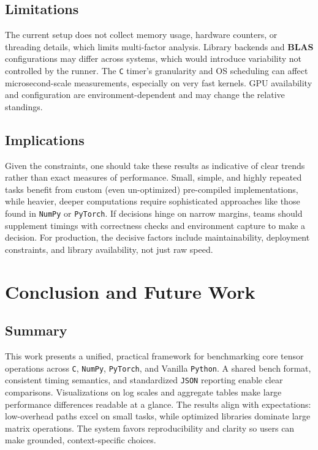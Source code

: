 \documentclass[a4paper,12pt]{article}
\begin{document}
\subsection{Limitations}
The current setup does not collect memory usage, hardware counters, or threading details, which limits multi-factor analysis. Library backends and \textbf{BLAS} configurations may differ across systems, which would introduce variability not controlled by the runner. The \texttt{C} timer’s granularity and OS scheduling can affect microsecond-scale measurements, especially on very fast kernels. GPU availability and configuration are environment-dependent and may change the relative standings.

\subsection{Implications}
Given the constraints, one should take these results as indicative of clear trends rather than exact measures of performance. Small, simple, and highly repeated tasks benefit from custom (even un-optimized) pre-compiled implementations, while heavier, deeper computations require sophisticated approaches like those found in \texttt{NumPy} or \texttt{PyTorch}. If decisions hinge on narrow margins, teams should supplement timings with correctness checks and environment capture to make a decision. For production, the decisive factors include maintainability, deployment constraints, and library availability, not just raw speed.

\section{Conclusion and Future Work}
\subsection{Summary}
This work presents a unified, practical framework for benchmarking core tensor operations across \texttt{C}, \texttt{NumPy}, \texttt{PyTorch}, and Vanilla \texttt{Python}. A shared bench format, consistent timing semantics, and standardized \texttt{JSON} reporting enable clear comparisons. Visualizations on log scales and aggregate tables make large performance differences readable at a glance. The results align with expectations: low-overhead paths excel on small tasks, while optimized libraries dominate large matrix operations. The system favors reproducibility and clarity so users can make grounded, context-specific choices.
\end{document}
